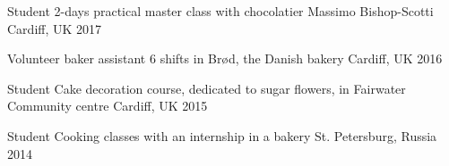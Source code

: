 


\begin{cvhonors}

  \cvhonor
    {Student} %
    {2-days practical master class with chocolatier Massimo Bishop-Scotti} %
    {Cardiff, UK} %
    {2017}

  \cvhonor
    {Volunteer baker assistant} %
    {6 shifts in Brød, the Danish bakery} %
    {Cardiff, UK} %
    {2016} %

  \cvhonor
    {Student} %
    {Cake decoration course, dedicated to sugar flowers, in Fairwater Community centre} %
    {Cardiff, UK} %
    {2015} %

  \cvhonor
    {Student} %
    {Cooking classes with an internship in a bakery} %
    {St. Petersburg, Russia} %
    {2014} %

\end{cvhonors}
